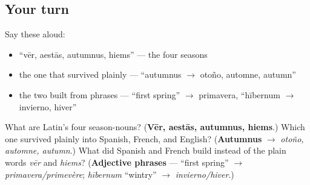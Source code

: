 \subsection*{Your turn}
Say these aloud:

\begin{itemize}
\raggedright
  \item \textquotedblleft{}vēr, aestās, autumnus, hiems\textquotedblright{} — the four seasons
  \item the one that survived plainly — \textquotedblleft{}autumnus $\to$ otoño, automne, autumn\textquotedblright{}
  \item the two built from phrases — \textquotedblleft{}first spring\textquotedblright{} $\to$ primavera, \textquotedblleft{}hībernum $\to$ invierno, hiver\textquotedblright{}
\end{itemize}

\begin{tcolorbox}[breakable,colback=teal!4,colframe=teal!35!black,title={Before you move on}]
What are Latin's four season-nouns? (\textbf{Vēr, aestās, autumnus, hiems}.) Which one survived plainly into Spanish, French, and English? (\textbf{Autumnus} $\to$ \emph{otoño, automne, autumn}.) What did Spanish and French build instead of the plain words \emph{vēr} and \emph{hiems}? (\textbf{Adjective phrases} — \textquotedblleft{}first spring\textquotedblright{} $\to$ \emph{primavera/primevère}; \emph{hībernum} \textquotedblleft{}wintry\textquotedblright{} $\to$ \emph{invierno/hiver}.)
\end{tcolorbox}
